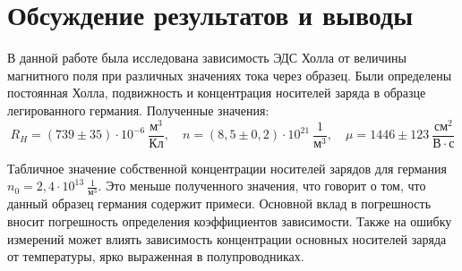 \documentclass[a4paper, 12pt]{article}
\begin{document}
\section{Обсуждение результатов и выводы}

В данной работе была исследована зависимость ЭДС Холла от величины магнитного поля при различных значениях тока через образец. Были определены постоянная Холла, подвижность и концентрация носителей заряда в образце легированного германия. Полученные значения:
$$\boxed{R_H = (739\pm35) \cdot 10^{-6}~\frac{м^3}{Кл}, \quad n = (8,5\pm0,2) \cdot 10^{21}~\frac{1}{м^3}, \quad \mu = 1446\pm123~\frac{см^2}{В \cdot с}}$$

Табличное значение собственной концентрации носителей зарядов для германия $n_0 = 2,4 \cdot 10^{13}~\frac{1}{м^3}$. Это меньше полученного значения, что говорит о том, что данный образец германия содержит примеси. Основной вклад в погрешность вносит погрешность определения коэффициентов зависимости. Также на ошибку измерений может влиять зависимость концентрации основных носителей заряда от температуры, ярко выраженная в полупроводниках.
\end{document}
